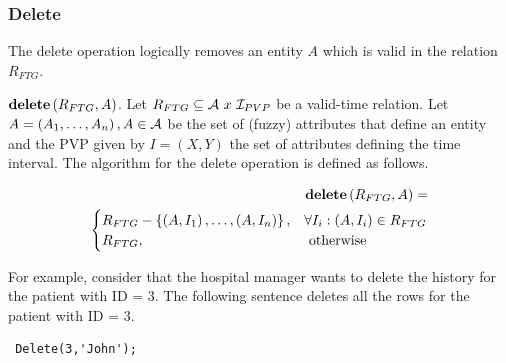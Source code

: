 \subsubsection{\label{subsubsec:delete-fuzzy-temporal}Delete}
The delete operation logically removes an entity $A$ which is valid in the relation $R_{FTG}$.

\begin{definition}
 \emph{$\mbox{\textbf{delete}} \left(R_{FTG} ,A \right) $}.
Let $R_{FTG} \subseteq \mathcal{A} \  x\  \mathcal{I}_{PVP}$ be a  valid-time relation. Let  $A=\left(A_1, \ldots, A_n \right), A \in \mathcal{A}$ be the set of (fuzzy) attributes that define an entity and the PVP given by $I = \left(X, Y\right)$ the set of attributes defining the time interval. The algorithm for the delete operation is defined as follows.
\end{definition}


\begin{align}
\label{eq:delete-fuzzy-temporal}
\mbox{\textbf{delete}} \left(R_{FTG} ,A \right) =\\
\begin{cases}
\nonumber
R_{FTG} - \left \lbrace \left(A, I_1 \right), \ldots, \left(A, I_n \right) \right \rbrace, &  \forall I_i: \left( A, I_i \right) \in R_{FTG}\\
R_{FTG}, & \mbox{ otherwise }  
\end{cases} 	
\end{align}

For example, consider that the hospital manager wants to delete the history for the patient with ID = 3. The following sentence deletes all the rows for the patient with ID = 3.

\begin{verbatim}
 Delete(3,'John');
\end{verbatim}


